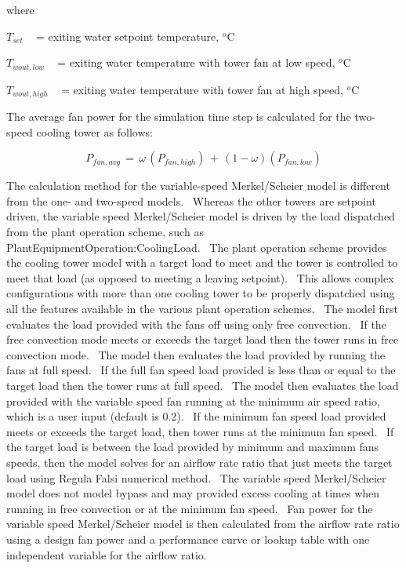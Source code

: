 where

\({T_{set}}\) ~ = exiting water setpoint temperature, \(^{o}\)C

\({T_{wout,low}}\) ~ = exiting water temperature with tower fan at low speed, \(^{o}\)C

\({T_{wout,high}}\) ~ = exiting water temperature with tower fan at high speed, \(^{o}\)C

The average fan power for the simulation time step is calculated for the two-speed cooling tower as follows:

\begin{equation}
{P_{fan,avg}}\, = \,\omega \,({P_{fan,high}})\, + \,\left( {1 - \omega } \right)\left( {{P_{fan,low}}} \right)
\end{equation}

The calculation method for the variable-speed Merkel/Scheier model is different from the one- and two-speed models.~ Whereas the other towers are setpoint driven, the variable speed Merkel/Scheier model is driven by the load dispatched from the plant operation scheme, such as PlantEquipmentOperation:CoolingLoad.~ The plant operation scheme provides the cooling tower model with a target load to meet and the tower is controlled to meet that load (as opposed to meeting a leaving setpoint).~ This allows complex configurations with more than one cooling tower to be properly dispatched using all the features available in the various plant operation schemes.~ The model first evaluates the load provided with the fans off using only free convection.~ If the free convection mode meets or exceeds the target load then the tower runs in free convection mode.~ The model then evaluates the load provided by running the fans at full speed.~ If the full fan speed load provided is less than or equal to the target load then the tower runs at full speed.~ The model then evaluates the load provided with the variable speed fan running at the minimum air speed ratio, which is a user input (default is 0.2).~ If the minimum fan speed load provided meets or exceeds the target load, then tower runs at the minimum fan speed.~ If the target load is between the load provided by minimum and maximum fans speeds, then the model solves for an airflow rate ratio that just meets the target load using Regula Falsi numerical method.~ The variable speed Merkel/Scheier model does not model bypass and may provided excess cooling at times when running in free convection or at the minimum fan speed.~ Fan power for the variable speed Merkel/Scheier model is then calculated from the airflow rate ratio using a design fan power and a performance curve or lookup table with one independent variable for the airflow ratio.

